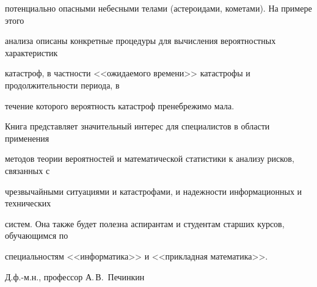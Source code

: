 потенциально опасными небесными телами (астероидами, кометами). На примере этого 


анализа описаны конкретные процедуры для вычисления вероятностных характеристик 


катастроф, в частности <<ожидаемого времени>> катастрофы и продолжительности периода, в 


течение которого вероятность катастроф пренебрежимо мала.


     


     Книга представляет значительный интерес для специалистов в области применения 


методов теории вероятностей и математической статистики к анализу рисков, связанных с 


чрезвычайными ситуациями и катастрофами, и надежности информационных и технических 


систем. Она также будет полезна аспирантам и студентам старших курсов, обучающимся по 


специальностям <<информатика>> и <<прикладная математика>>. 


     


Д.ф.-м.н., профессор							А.\,В.~Печинкин


     


